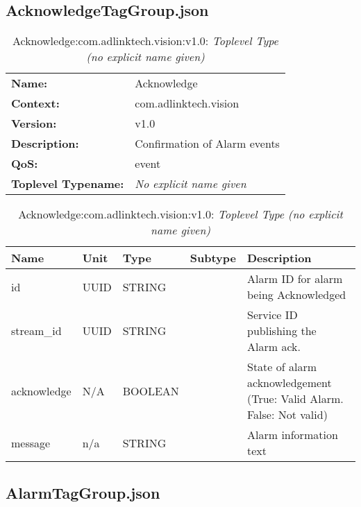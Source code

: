 \subsection{AcknowledgeTagGroup.json}

\begin{table}[H]
\begin{tabularx}{\textwidth}{l X} 
       \textbf{Name:} & Acknowledge \\ 
	   \textbf{Context:} & com.adlinktech.vision \\ 
	   \textbf{Version:} & v1.0 \\ 
	   \textbf{Description:} & Confirmation of Alarm events \\ 
	   \textbf{QoS:} & event \\
	   \textbf{Toplevel Typename:} & \textit{No explicit name given} \\ 
\end{tabularx}
\caption{Acknowledge:com.adlinktech.vision:v1.0}\label{AcknowledgeTagGroup.json:table:Acknowledge}
\bigskip
\begin{tabularx}{\textwidth}{l l l l X} 
	 \textbf{Name} & \textbf{Unit} & \textbf{Type} & \textbf{Subtype} & \textbf{Description} \\
	 \midrule
   id & UUID & STRING &  & Alarm ID for alarm being Acknowledged \\
   stream\_id & UUID & STRING &  & Service ID publishing the Alarm ack. \\
   acknowledge & N/A & BOOLEAN &  & State of alarm acknowledgement (True: Valid Alarm. False: Not valid) \\
   message & n/a & STRING &  & Alarm information text \\
\end{tabularx}
\caption{Acknowledge:com.adlinktech.vision:v1.0: \textit{Toplevel Type (no explicit name given)}}\label{AcknowledgeTagGroup.json:table:Acknowledge-no-type-given}


\end{table}

\subsection{AlarmTagGroup.json}

